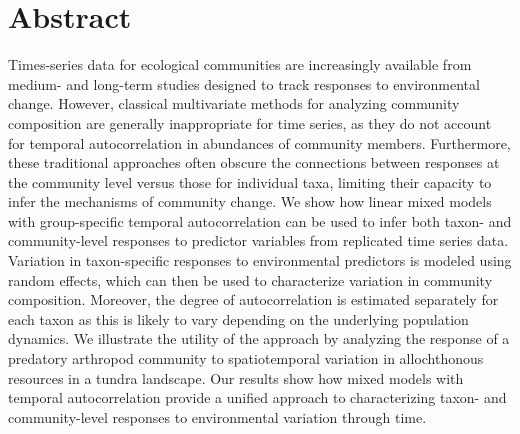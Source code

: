 
\section*{Abstract}

Times-series data for ecological communities are increasingly available from
medium- and long-term studies designed to track responses to environmental change.
However, classical multivariate methods for analyzing community composition are
generally inappropriate for time series, as they do not account for temporal
autocorrelation in abundances of community members.
Furthermore, these traditional approaches often obscure the connections between
responses at the community level versus those for individual taxa, limiting
their capacity to infer the mechanisms of community change.
We show how linear mixed models with group-specific temporal autocorrelation can be
used to infer both taxon- and community-level responses to predictor variables from
replicated time series data.
Variation in taxon-specific responses to environmental predictors is modeled using
random effects, which can then be used to characterize variation in community composition.
Moreover, the degree of autocorrelation is estimated separately for each taxon as
this is likely to vary depending on the underlying population dynamics.
We illustrate the utility of the approach by analyzing the response of a predatory
arthropod community to spatiotemporal variation in allochthonous resources in a
tundra landscape.
Our results show how mixed models with temporal autocorrelation provide a unified
approach to characterizing taxon- and community-level responses to environmental
variation through time.
